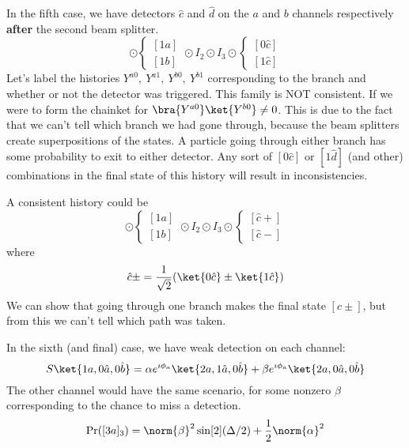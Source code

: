 \documentclass[a4paper,twoside,master.tex]{subfiles}
\begin{document}
In the fifth case, we have detectors $ \hat{c} $ and $ \hat{d} $ on the $ a $ and $ b $ channels respectively \textbf{after} the second beam splitter.
\begin{equation}
    [\Phi_0] \odot \begin{cases} [1a]\\ [1b] \end{cases} \odot I_2 \odot I_3 \odot \begin{cases} [0 \hat{c}]\\ [1 \hat{c}] \end{cases}
\end{equation}
Let's label the histories $ Y^{a0},\ Y^{a1},\ Y^{b0},\ Y^{b1} $ corresponding to the branch and whether or not the detector was triggered. This family is NOT consistent. If we were to form the chainket for $ \bra{Y^{a0}} \ket{Y^{b0}} \neq 0 $. This is due to the fact that we can't tell which branch we had gone through, because the beam splitters create superpositions of the states. A particle going through either branch has some probability to exit to either detector. Any sort of $ [0 \hat{c}] $ or $ [1 \hat{d}] $ (and other) combinations in the final state of this history will result in inconsistencies.

A consistent history could be
\begin{equation}
    [\Psi_0] \odot \begin{cases} [1a]\\ [1b] \end{cases} \odot I_2 \odot I_3 \odot \begin{cases} [ \hat{c} +]\\ [ \hat{c} -] \end{cases} 
\end{equation}
where
\begin{equation}
    \hat{c}\pm = \frac{1}{\sqrt{2}} (\ket{0 \hat{c}} \pm \ket{1 \hat{c}})
\end{equation}
We can show that going through one branch makes the final state $ [\hat{c}\pm] $, but from this we can't tell which path was taken.

In the sixth (and final) case, we have weak detection on each channel:
\begin{equation}
    S \ket{1a,0 \hat{a},0 \hat{b}} = \alpha e^{\imath\phi_a} \ket{2a,1 \hat{a}, 0 \hat{b}} + \beta e^{\imath\phi_a} \ket{2a,0 \hat{a},0 \hat{b}}
\end{equation}
The other channel would have the same scenario, for some nonzero $\beta$ corresponding to the chance to miss a detection.
\begin{equation}
    \Pr([3a]_3) = \norm{\beta}^2 \sin[2](\Delta/2) + \frac{1}{2}\norm{\alpha}^2
\end{equation}
\end{document}
